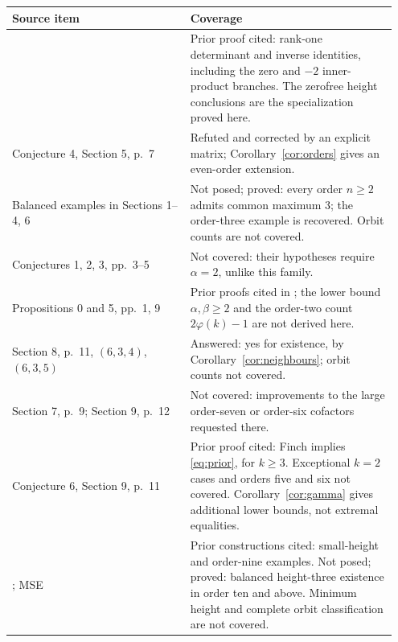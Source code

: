 \documentclass[11pt,a4paper]{article}
\begin{document}
\begin{center}
\small
\begin{tabular}{@{}p{0.44\linewidth}p{0.51\linewidth}@{}}
\toprule
Source item & Coverage\\
\midrule
\cite[Section 2, Theorem 1; Corollaries 1--2]{towse}
& Prior proof cited: rank-one determinant and inverse identities,
including the zero and $-2$ inner-product branches. The zerofree
height conclusions are the specialization proved here.\\[3pt]
Conjecture 4, Section 5, p.~7 & Refuted and corrected by an explicit
matrix; Corollary~\ref{cor:orders} gives an even-order extension.\\[3pt]
Balanced examples in Sections 1--4, 6 & Not posed; proved: every order $n\geq2$
admits common maximum $3$; the order-three example is recovered.
Orbit counts are not covered.\\[3pt]
Conjectures 1, 2, 3, pp.~3--5 & Not covered: their hypotheses
require $\alpha=2$, unlike this family.\\[3pt]
Propositions 0 and 5, pp.~1, 9 & Prior proofs cited in \cite{finch};
the lower bound $\alpha,\beta\geq2$ and
the order-two count $2\varphi(k)-1$ are not
derived here.\\[3pt]
Section 8, p.~11, $(6,3,4)$, $(6,3,5)$ & Answered: yes for existence,
by Corollary~\ref{cor:neighbours}; orbit counts not covered.\\[3pt]
Section 7, p.~9; Section 9, p.~12 & Not covered: improvements to the
large order-seven or order-six cofactors requested there.\\[3pt]
Conjecture 6, Section 9, p.~11 & Prior proof cited: Finch \cite{large}
implies \eqref{eq:prior}, for $k\geq3$. Exceptional $k=2$ cases and
orders five and six not covered. Corollary~\ref{cor:gamma} gives
additional lower bounds, not extremal equalities.\\[3pt]
\cite[Sections 2--6; Addendum I, p.~15]{roots}; MSE \cite{mse}
& Prior constructions cited: small-height and order-nine examples.
Not posed; proved: balanced height-three existence in order ten and above.
Minimum height and complete orbit classification are not covered.\\
\bottomrule
\end{tabular}
\end{center}
\end{document}
